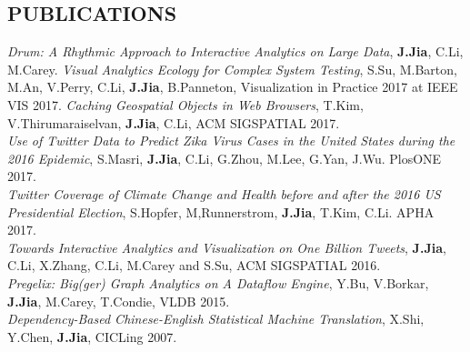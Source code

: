 \documentclass{res}
\begin{document}
\begin{resume}
\section{PUBLICATIONS}
\emph{Drum: A Rhythmic Approach to Interactive Analytics on Large Data}, \textbf{J.Jia}, C.Li, M.Carey.
\emph{Visual Analytics Ecology for Complex System Testing}, S.Su, M.Barton, M.An, V.Perry, C.Li, \textbf{J.Jia}, B.Panneton, Visualization in Practice 2017 at IEEE VIS 2017.
\emph{Caching Geospatial Objects in Web Browsers}, T.Kim, V.Thirumaraiselvan, \textbf{J.Jia}, C.Li, ACM SIGSPATIAL 2017.\\
\emph{Use of Twitter Data to Predict Zika Virus Cases in the United States during the 2016 Epidemic}, S.Masri, \textbf{J.Jia}, C.Li, G.Zhou, M.Lee, G.Yan, J.Wu. PlosONE 2017.\\
\emph{Twitter Coverage of Climate Change and Health before and after the 2016 US Presidential Election}, S.Hopfer, M,Runnerstrom, \textbf{J.Jia}, T.Kim, C.Li. APHA 2017. \\
\emph{Towards Interactive Analytics and Visualization on One Billion Tweets}, \textbf{J.Jia}, C.Li, X.Zhang, C.Li, M.Carey and S.Su, ACM SIGSPATIAL 2016.\\
\emph{Pregelix: Big(ger) Graph Analytics on A Dataflow Engine}, Y.Bu, V.Borkar, \textbf{J.Jia}, M.Carey, T.Condie, VLDB 2015.\\
\emph{Dependency-Based Chinese-English Statistical Machine Translation}, X.Shi, Y.Chen, \textbf{J.Jia}, CICLing 2007.\\

\end{resume}
\end{document}
